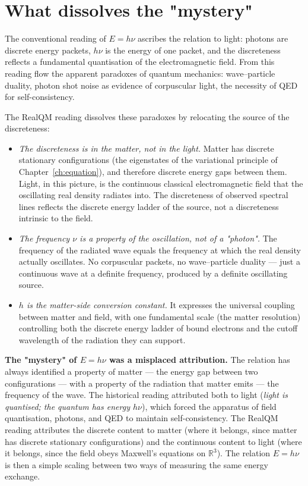 \section{What dissolves the "mystery"}\label{sec:hf-mystery-dissolved}

The conventional reading of $E = h\nu$ ascribes the relation to light: photons are discrete energy packets, $h\nu$ is the energy of one packet, and the discreteness reflects a fundamental quantisation of the electromagnetic field. From this reading flow the apparent paradoxes of quantum mechanics: wave--particle duality, photon shot noise as evidence of corpuscular light, the necessity of QED for self-consistency.

The RealQM reading dissolves these paradoxes by relocating the source of the discreteness:

\begin{itemize}
\item \emph{The discreteness is in the matter, not in the light.} Matter has discrete stationary configurations (the eigenstates of the variational principle of Chapter~\ref{ch:equation}), and therefore discrete energy gaps between them. Light, in this picture, is the continuous classical electromagnetic field that the oscillating real density radiates into. The discreteness of observed spectral lines reflects the discrete energy ladder of the source, not a discreteness intrinsic to the field.
\item \emph{The frequency $\nu$ is a property of the oscillation, not of a "photon".} The frequency of the radiated wave equals the frequency at which the real density actually oscillates. No corpuscular packets, no wave--particle duality --- just a continuous wave at a definite frequency, produced by a definite oscillating source.
\item \emph{$h$ is the matter-side conversion constant.} It expresses the universal coupling between matter and field, with one fundamental scale (the matter resolution) controlling both the discrete energy ladder of bound electrons and the cutoff wavelength of the radiation they can support.
\end{itemize}

\textbf{The "mystery" of $E = h\nu$ was a misplaced attribution.} The relation has always identified a property of matter --- the energy gap between two configurations --- with a property of the radiation that matter emits --- the frequency of the wave. The historical reading attributed both to light (\emph{light is quantised; the quantum has energy $h\nu$}), which forced the apparatus of field quantisation, photons, and QED to maintain self-consistency. The RealQM reading attributes the discrete content to matter (where it belongs, since matter has discrete stationary configurations) and the continuous content to light (where it belongs, since the field obeys Maxwell's equations on $\mathbb{R}^3$). The relation $E = h\nu$ is then a simple scaling between two ways of measuring the same energy exchange.

